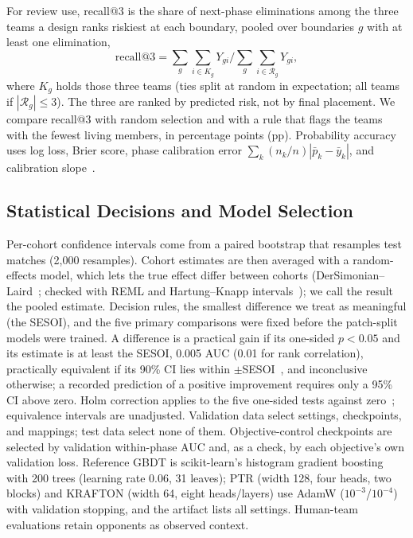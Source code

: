 \documentclass[sigconf,anonymous]{acmart}
\begin{document}
For review use, recall@3 is the share of next-phase eliminations among the three teams a design ranks riskiest at each boundary, pooled over boundaries $g$ with at least one elimination,
\[
\mathrm{recall@3}=\sum_g\sum_{i\in K_g}Y_{gi}\Big/\sum_g\sum_{i\in\mathcal{R}_g}Y_{gi},
\]
where $K_g$ holds those three teams (ties split at random in expectation; all teams if $|\mathcal{R}_g|\le3$). The three are ranked by predicted risk, not by final placement. We compare recall@3 with random selection and with a rule that flags the teams with the fewest living members, in percentage points (pp). Probability accuracy uses log loss, Brier score, phase calibration error $\sum_k(n_k/n)|\bar p_k-\bar y_k|$, and calibration slope~\cite{VanCalster16}.

\subsection{Statistical Decisions and Model Selection}
Per-cohort confidence intervals come from a paired bootstrap that resamples test matches (2,000 resamples). Cohort estimates are then averaged with a random-effects model, which lets the true effect differ between cohorts (DerSimonian--Laird~\cite{DerSimonian86}; checked with REML and Hartung--Knapp intervals~\cite{HartungKnapp01}); we call the result the pooled estimate. Decision rules, the smallest difference we treat as meaningful (the SESOI), and the five primary comparisons were fixed before the patch-split models were trained. A difference is a practical gain if its one-sided $p<0.05$ and its estimate is at least the SESOI, 0.005 AUC (0.01 for rank correlation), practically equivalent if its 90\% CI lies within $\pm$SESOI~\cite{Schuirmann87}, and inconclusive otherwise; a recorded prediction of a positive improvement requires only a 95\% CI above zero. Holm correction applies to the five one-sided tests against zero~\cite{Holm79}; equivalence intervals are unadjusted. Validation data select settings, checkpoints, and mappings; test data select none of them. Objective-control checkpoints are selected by validation within-phase AUC and, as a check, by each objective's own validation loss. Reference GBDT is scikit-learn's histogram gradient boosting with 200 trees (learning rate 0.06, 31 leaves); PTR (width 128, four heads, two blocks) and KRAFTON (width 64, eight heads/layers) use AdamW ($10^{-3}$/$10^{-4}$) with validation stopping, and the artifact lists all settings. Human-team evaluations retain opponents as observed context.
\end{document}
